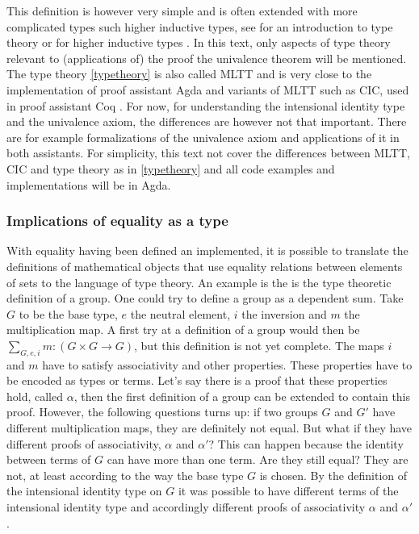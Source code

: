 \documentclass[12pt,a4paper,twoside,xetex]{book} %
\begin{document}
This definition is however very simple and is often extended with more complicated types such higher inductive types, see for an introduction to type theory
\cite{Palmgren2014} or for higher inductive types \cite{Voevodsky2013}. In this text, only aspects of type 
theory relevant to (applications of) the proof the univalence theorem will be 
mentioned. The type theory \cref{typetheory} is also called MLTT and is very close to the implementation of proof assistant Agda \cite{Abel2019} and variants of MLTT such as CIC, used in proof assistant Coq \cite{Arias2019}. For now, for understanding the intensional 
identity type and the univalence axiom, the differences are however not that 
important. There are for example formalizations of the univalence axiom and 
applications of it in both assistants. For simplicity, this text not cover the differences between MLTT,  CIC and type theory as in \cref{typetheory} and all code examples and implementations will be in Agda.

\subsubsection{Implications of equality as a type}\label{groupex}

With equality having been defined an implemented, it is possible to translate 
the definitions of mathematical objects that use equality relations between 
elements of sets to the language of type theory. An example is the is the type 
theoretic definition of a group. One could try to define a group as a dependent 
sum. Take $G$ to be the base type, $e$ the neutral element, $i$ the inversion 
and $m$ the multiplication map. A first try at a definition of a group would 
then be $\sum_{G,e,i}m:(G\times G \rightarrow G)$, but this definition is not 
yet complete. The maps $i$ and $m$  have to satisfy associativity and other 
properties. These properties have to be encoded as types or terms. Let's say there is a proof that these properties hold, called $\alpha$, then the first definition of a group can be extended to contain this proof. However, the following questions turns up: if two groups $G$ and $G'$ have different multiplication 
maps, they are definitely not equal. But what if they have different proofs of 
associativity, $\alpha$ and $\alpha'$? This can happen because the identity 
between terms of  $G$ can have more than one term. Are they still equal? They 
are not, at least according to the way the base type $G$ is chosen. By the 
definition of the intensional identity type on $G$ it was possible to have 
different terms of the intensional identity type and accordingly different 
proofs of associativity $\alpha$ and $\alpha'$.
\end{document}
